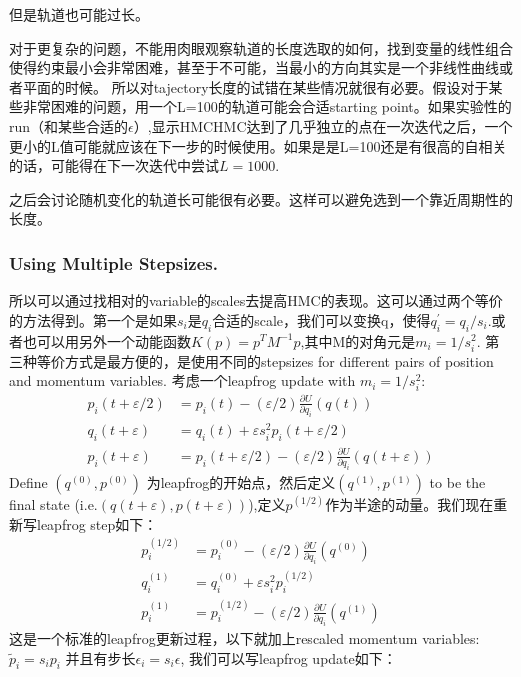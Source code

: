 \documentclass[
]{book}
\theoremstyle{definition}
\theoremstyle{definition}
\theoremstyle{definition}
\theoremstyle{remark}
\begin{document}
但是轨道也可能过长。

对于更复杂的问题，不能用肉眼观察轨道的长度选取的如何，找到变量的线性组合使得约束最小会非常困难，甚至于不可能，当最小的方向其实是一个非线性曲线或者平面的时候。
所以对tajectory长度的试错在某些情况就很有必要。假设对于某些非常困难的问题，用一个L=100的轨道可能会合适starting point。如果实验性的run（和某些合适的\(\epsilon\)）,显示HMCHMC达到了几乎独立的点在一次迭代之后，一个更小的L值可能就应该在下一步的时候使用。如果是是L=100还是有很高的自相关的话，可能得在下一次迭代中尝试\(L=1000\).

之后会讨论随机变化的轨道长可能很有必要。这样可以避免选到一个靠近周期性的长度。

\hypertarget{using-multiple-stepsizes.}{%
\subsubsection{Using Multiple Stepsizes.}\label{using-multiple-stepsizes.}}

所以可以通过找相对的variable的scales去提高HMC的表现。这可以通过两个等价的方法得到。第一个是如果\(s_i\)是\(q_i\)合适的scale，我们可以变换q，使得\(q_{i}^{\prime}=q_{i} / s_{i}\).或者也可以用另外一个动能函数\(K(p)=p^TM^{-1}p\),其中M的对角元是\(m_i=1/s_i^2\).
第三种等价方式是最方便的，是使用不同的stepsizes for different pairs of position and momentum variables. 考虑一个leapfrog update with \(m_i=1/s_i^2\):
\[
\begin{aligned} p_{i}(t+\varepsilon / 2) &=p_{i}(t)-(\varepsilon / 2) \frac{\partial U}{\partial q_{i}}(q(t)) \\ q_{i}(t+\varepsilon) &=q_{i}(t)+\varepsilon s_{i}^{2} p_{i}(t+\varepsilon / 2) \\ p_{i}(t+\varepsilon) &=p_{i}(t+\varepsilon / 2)-(\varepsilon / 2) \frac{\partial U}{\partial q_{i}}(q(t+\varepsilon)) \end{aligned}
\]
Define \((q^{(0)},p^{(0)})\) 为leapfrog的开始点，然后定义\(\left(q^{(1)}, p^{(1)}\right)\) to be the final state (i.e.\((q(t+\varepsilon), p(t+\varepsilon))\)),定义\(p^{(1/2)}\)作为半途的动量。我们现在重新写leapfrog step如下：
\[
\begin{aligned} p_{i}^{(1 / 2)} &=p_{i}^{(0)}-(\varepsilon / 2) \frac{\partial U}{\partial q_{i}}\left(q^{(0)}\right) \\ q_{i}^{(1)} &=q_{i}^{(0)}+\varepsilon s_{i}^{2} p_{i}^{(1 / 2)} \\ p_{i}^{(1)} &=p_{i}^{(1 / 2)}-(\varepsilon / 2) \frac{\partial U}{\partial q_{i}}\left(q^{(1)}\right) \end{aligned}
\]
这是一个标准的leapfrog更新过程，以下就加上rescaled momentum variables: \(\tilde{p}_{i}=s_{i} p_{i}\) 并且有步长\(\epsilon_i=s_i\epsilon\), 我们可以写leapfrog update如下：
\end{document}
